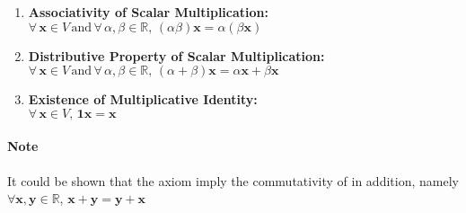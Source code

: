 \documentclass[11pt]{report}
\begin{document}
\begin{definition}
\begin{enumerate}
\begin{enumerate}
            \item \textbf{Associativity of Scalar Multiplication:} \\
            $\forall \, \textbf{x} \in V \, \text{and} \, \forall \, \alpha, \beta \in \mathbb{R}, \, (\alpha \beta) \textbf{x} = \alpha (\beta \textbf{x})$
            
            \item \textbf{Distributive Property of Scalar Multiplication:} \\
            $\forall \, \textbf{x} \in V \, \text{and} \, \forall \, \alpha, \beta \in \mathbb{R}, \, (\alpha + \beta) \textbf{x} = \alpha \textbf{x} + \beta \textbf{x}$
            
            \item \textbf{Existence of Multiplicative Identity:} \\
            $\forall \, \textbf{x} \in V, \, \textbf{1} \textbf{x} = \textbf{x}$
        \end{enumerate}
    \end{enumerate}
     
    \paragraph{Note} It could be shown that the axiom imply the commutativity of in addition, namely $\forall \textbf{x}, \textbf{y} \in \mathbb{R}$, $\textbf{x} + \textbf{y} = \textbf{y} + \textbf{x}$
\end{definition}
\end{document}
